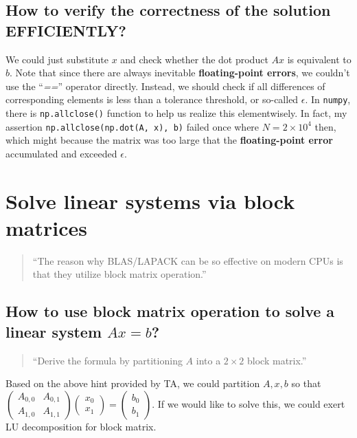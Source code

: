 \documentclass[12pt, a4paper]{article}
\begin{document}
\subsection{How to verify the correctness of the solution EFFICIENTLY?}

We could just substitute $x$ and check whether the dot product $Ax$ is equivalent to $b$. Note that since there are always inevitable \textbf{floating-point errors}, we couldn't use the ``\textit{==}'' operator directly. Instead, we should check if all differences of corresponding elements is less than a tolerance threshold, or so-called $\epsilon$. In \texttt{numpy}, there is \texttt{np.allclose()} function to help us realize this elementwisely. In fact, my assertion \texttt{np.allclose(np.dot(A, x), b)} failed once where $N=2\times10^4$ then, which might because the matrix was too large that the \textbf{floating-point error} accumulated and exceeded $\epsilon$.

\section{Solve linear systems via block matrices}

\begin{quote}

``The reason why \textsf{BLAS}/\textsf{LAPACK} can be so effective on modern CPUs is that they utilize block matrix operation.''

\end{quote}

\subsection{How to use block matrix operation to solve a linear system $Ax=b$?}

\begin{quote}

``Derive the formula by partitioning $A$ into a $2\times 2$ block matrix.''

\end{quote}

Based on the above hint provided by TA, we could partition $A,x,b$ so that $\begin{pmatrix}A_{0,0}&A_{0,1}\\A_{1,0}&A_{1,1}\end{pmatrix}\begin{pmatrix}x_0\\x_1\end{pmatrix}=\begin{pmatrix}b_0\\b_1\end{pmatrix}$. If we would like to solve this, we could exert \textsf{LU decomposition} for block matrix.
\end{document}
